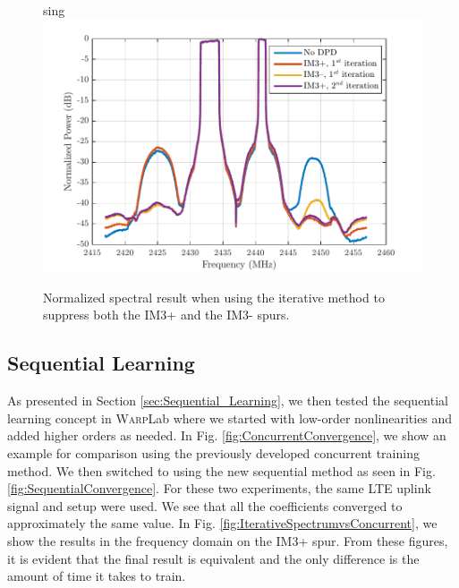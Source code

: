 \begin{figure}[t!] 
	\centering
	sing \includegraphics[width=0.9\columnwidth]{RightThenLeft_NEW}
	\caption{Normalized spectral result when using the iterative method to suppress both the IM3+ and the IM3- spurs.}
	\label{fig:RightThenLeft}
\end{figure}

\subsection{Sequential Learning}
As presented in Section \ref{sec:Sequential_Learning}, we then tested the sequential learning concept in \textsc{Warp}Lab where we started with low-order nonlinearities and added higher orders as needed. 
In Fig. \ref{fig:ConcurrentConvergence}, we show an example for comparison using the previously developed concurrent training method. 
We then switched to using the new sequential method as seen in Fig. \ref{fig:SequentialConvergence}. For these two experiments, the same LTE uplink signal and setup were used. 
We see that all the coefficients converged to approximately the same value. 
In Fig. \ref{fig:IterativeSpectrumvsConcurrent}, we show the results in the frequency domain on the IM3+ spur. 
From these figures, it is evident that the final result is equivalent and the only difference is the amount of time it takes to train.

